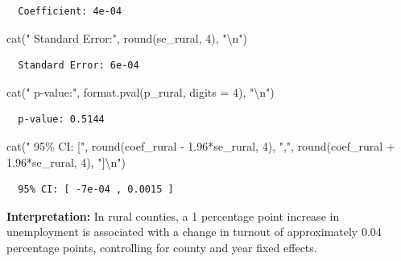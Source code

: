 \documentclass[
  11pt,
]{article}
\newenvironment{Shaded}{\begin{snugshade}}{\end{snugshade}}
\newcommand{\AttributeTok}[1]{\textcolor[rgb]{0.40,0.45,0.13}{#1}}
\newcommand{\DecValTok}[1]{\textcolor[rgb]{0.68,0.00,0.00}{#1}}
\newcommand{\FloatTok}[1]{\textcolor[rgb]{0.68,0.00,0.00}{#1}}
\newcommand{\FunctionTok}[1]{\textcolor[rgb]{0.28,0.35,0.67}{#1}}
\newcommand{\NormalTok}[1]{\textcolor[rgb]{0.00,0.23,0.31}{#1}}
\newcommand{\SpecialCharTok}[1]{\textcolor[rgb]{0.37,0.37,0.37}{#1}}
\newcommand{\StringTok}[1]{\textcolor[rgb]{0.13,0.47,0.30}{#1}}
\begin{document}
\begin{verbatim}
  Coefficient: 4e-04 
\end{verbatim}

\begin{Shaded}
\begin{Highlighting}[]
\FunctionTok{cat}\NormalTok{(}\StringTok{"  Standard Error:"}\NormalTok{, }\FunctionTok{round}\NormalTok{(se\_rural, }\DecValTok{4}\NormalTok{), }\StringTok{"}\SpecialCharTok{\textbackslash{}n}\StringTok{"}\NormalTok{)}
\end{Highlighting}
\end{Shaded}

\begin{verbatim}
  Standard Error: 6e-04 
\end{verbatim}

\begin{Shaded}
\begin{Highlighting}[]
\FunctionTok{cat}\NormalTok{(}\StringTok{"  p{-}value:"}\NormalTok{, }\FunctionTok{format.pval}\NormalTok{(p\_rural, }\AttributeTok{digits =} \DecValTok{4}\NormalTok{), }\StringTok{"}\SpecialCharTok{\textbackslash{}n}\StringTok{"}\NormalTok{)}
\end{Highlighting}
\end{Shaded}

\begin{verbatim}
  p-value: 0.5144 
\end{verbatim}

\begin{Shaded}
\begin{Highlighting}[]
\FunctionTok{cat}\NormalTok{(}\StringTok{"  95\% CI: ["}\NormalTok{, }\FunctionTok{round}\NormalTok{(coef\_rural }\SpecialCharTok{{-}} \FloatTok{1.96}\SpecialCharTok{*}\NormalTok{se\_rural, }\DecValTok{4}\NormalTok{), }\StringTok{","}\NormalTok{, }
    \FunctionTok{round}\NormalTok{(coef\_rural }\SpecialCharTok{+} \FloatTok{1.96}\SpecialCharTok{*}\NormalTok{se\_rural, }\DecValTok{4}\NormalTok{), }\StringTok{"]}\SpecialCharTok{\textbackslash{}n}\StringTok{"}\NormalTok{)}
\end{Highlighting}
\end{Shaded}

\begin{verbatim}
  95% CI: [ -7e-04 , 0.0015 ]
\end{verbatim}

\textbf{Interpretation:} In rural counties, a 1 percentage point
increase in unemployment is associated with a change in turnout of
approximately 0.04 percentage points, controlling for county and year
fixed effects.
\end{document}
